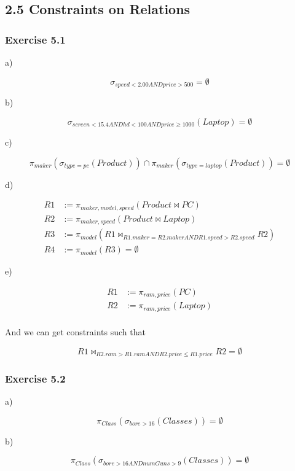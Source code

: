 \documentclass[../../main.tex]{subfiles}
\begin{document}
\subsection*{2.5 Constraints on Relations}

\subsubsection*{Exercise 5.1}

a)

$$
\sigma_{speed < 2.00 AND price > 500} = \emptyset
$$

b)

$$
\sigma_{screen < 15.4 AND hd < 100 AND
price \geq 1000}(Laptop) = \emptyset$$

c)

$$
\pi_{maker}(\sigma_{type=pc}(Product))
\cap \pi_{maker}(\sigma_{type=laptop}(
Product)) = \emptyset
$$

d)

\begin{align*}
  R1 &:= \pi_{maker, model, speed}(Product \bowtie PC) \\
  R2 &:= \pi_{maker, speed}(Product \bowtie Laptop) \\
  R3 &:= \pi_{model}(R1 \bowtie_{R1.maker=R2.maker AND 
         R1.speed > R2.speed} R2) \\
  R4 &:= \pi_{model}(R3) = \emptyset
\end{align*}

e)

\begin{align*}
  R1 &:= \pi_{ram, price}(PC) \\
  R2 &:= \pi_{ram, price}(Laptop) \\
\end{align*}

And we can get constraints such that

$$
R1 \bowtie_{R2.ram > R1.ram AND
R2.price \leq R1.price} R2 = \emptyset
$$

\subsubsection*{Exercise 5.2}

a)

$$
\pi_{Class}(\sigma_{bore > 16}(Classes))
= \emptyset
$$

b)

$$
\pi_{Class}(\sigma_{bore > 16
AND numGuns > 9}(Classes))= \emptyset
$$
\end{document}
